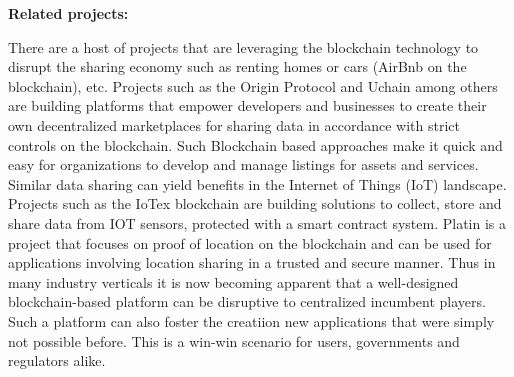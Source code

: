 %
%
%

\noindent
{\bf \textsf Related projects:}

There are a host of projects that are leveraging the blockchain technology to disrupt the sharing economy such as
renting homes or cars (AirBnb on the blockchain), etc. Projects such as the Origin Protocol and Uchain among others are
building platforms that empower developers and businesses to create their own decentralized marketplaces for sharing
data in accordance with strict controls on the blockchain.  Such Blockchain based approaches make it quick and easy for
organizations to develop and manage listings for assets and services. Similar data sharing can yield benefits in the
Internet of Things (IoT) landscape. Projects such as the IoTex blockchain are building solutions to collect, store and
share data from IOT sensors, protected with a smart contract system.  Platin \cite{platin} is a project that focuses on
proof of location on the blockchain and can be used for applications involving location sharing in a trusted and secure
manner. Thus in many industry verticals it is now becoming apparent that a well-designed blockchain-based platform can
be disruptive to centralized incumbent players. Such a platform can also foster the creatiion new applications that were
simply not possible before. This is a win-win scenario for users, governments and regulators alike.

